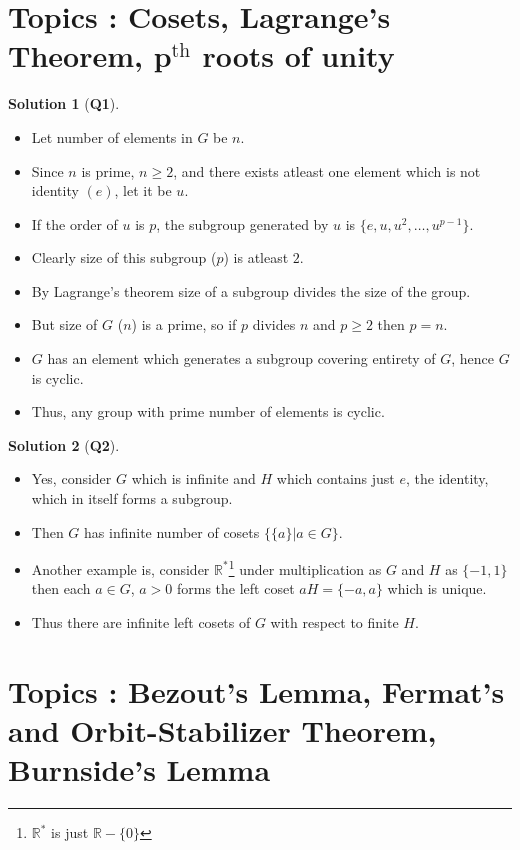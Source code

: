 \documentclass{article}
\theoremstyle{definition}
\newtheorem*{sol}{Solution}
\begin{document}
\section{Topics : Cosets, Lagrange's Theorem, p$^\text{th}$ roots of unity}
\begin{sol}[\textbf{Q1}]

	\begin{itemize}
		\item Let number of elements in $G$ be $n$.
		\item Since $n$ is prime, $ n\geq 2$, and there exists atleast
		      one element which is not identity $\left(e\right)$, let it
		      be $u$.
		\item 	If the order of $u$ is $p$, the subgroup generated by
		      $u$ is $\{e,u,u^2,\dots,u^{p-1}\}$.
		\item 	Clearly size of this subgroup ($p$) is atleast
		      $2$.
		\item 	By Lagrange's theorem size of a subgroup divides the size of the group.
		\item 	But size of $G$ ($n$) is a prime, so if $p$ divides $n$ and $p\geq 2$ then $p=n$.
		\item 	$G$ has an element which generates a subgroup covering entirety of $G$, hence $G$ is cyclic.
		\item 	Thus, any group with prime number of elements is cyclic.
	\end{itemize}
\end{sol}

\begin{sol}[\textbf{Q2}]
	\begin{itemize}
		\item 	Yes, consider $G$ which is infinite and $H$ which contains just
		      $e$, the identity, which in itself forms a subgroup.
		\item 	Then $G$ has infinite number of cosets $\{
			      \{a\} | a\in G \}$.
		\item 	Another example is, consider
		      $\mathbb{R}^*$\footnote{$\mathbb{R}^*$ is just
			      $\mathbb{R}-\{0\}$} under multiplication as $G$
		      and $H$ as $\{-1,1\}$ then each $a\in G$, $a > 0$
		      forms the left coset $aH=\{-a,a\}$ which is
		      unique.
		\item 	Thus there are infinite left cosets of $G$ with respect to finite $H$.
	\end{itemize}
\end{sol}

\section{Topics : Bezout's Lemma, Fermat's and Orbit-Stabilizer Theorem, Burnside's Lemma}
\end{document}
